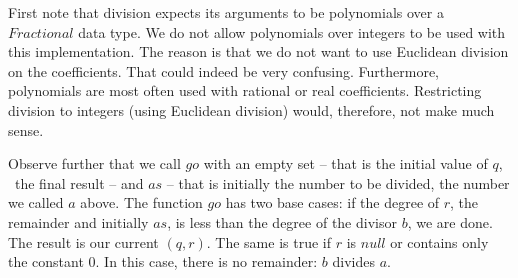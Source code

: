 \documentclass[tikz]{scrreprt}
\newcommand{\Conid}[1]{\mathit{#1}}
\newcommand{\Varid}[1]{\mathit{#1}}
\newcommand{\plus}{\mathbin{+\!\!\!+}}
\def\resethooks{%
  \global\let\SaveRestoreHook\empty
  \global\let\ColumnHook\empty}
\newlength{\blanklineskip}
\begin{document}
\begin{minipage}{\textwidth}
\)\par\noindent\endgroup\resethooks
\end{minipage}

First note that division expects its arguments
to be polynomials over a \ensuremath{\Conid{Fractional}} data type.
We do not allow polynomials over integers to be used
with this implementation. The reason is that we do not
want to use Euclidean division on the coefficients.
That could indeed be very confusing. Furthermore,
polynomials are most often used with rational or real
coefficients. Restricting division to integers
(using Euclidean division) would, therefore, not make
much sense.

Observe further that we call \ensuremath{\Varid{go}} with an empty set --
that is the initial value of $q$, \ie\ the final result --
and $as$ -- that is initially the number to be divided,
the number we called $a$ above.
The function \ensuremath{\Varid{go}} has two base cases:
if the degree of $r$, the remainder and initially $as$,
is less than the degree of the divisor $b$, we are done.
The result is our current $(q,r)$. 
The same is true if $r$ is \ensuremath{\Varid{null}} or 
contains only the constant 0.
In this case, there is no remainder: $b$ divides $a$.
\end{document}
